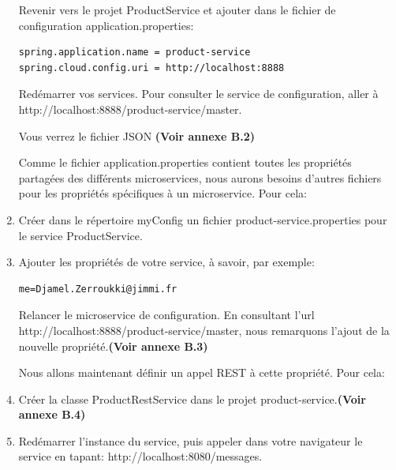 \begin{enumerate}
    	Revenir vers le projet ProductService et ajouter dans le fichier de configuration application.properties:
\begin{lstlisting}
spring.application.name = product-service
spring.cloud.config.uri = http://localhost:8888
\end{lstlisting}
    	
    	Redémarrer vos services. Pour consulter le service de configuration, aller à {\color{red} http://localhost:8888/product-service/master}. 
    	
    	Vous verrez le fichier JSON  \textbf{(Voir annexe B.2)}
    
    	Comme le fichier application.properties contient toutes les propriétés partagées des différents microservices, nous aurons besoins d'autres fichiers pour les propriétés spécifiques à un microservice. Pour cela:
    	
    	\item Créer dans le répertoire myConfig un fichier product-service.properties pour le service ProductService.
    	
    	\item  Ajouter les propriétés de votre service, à savoir, par exemple:
    	
\begin{lstlisting}
me=Djamel.Zerroukki@jimmi.fr
\end{lstlisting} 
    	
    	Relancer le microservice de configuration. En consultant l'url {\color{red}http://localhost:8888/product-service/master}, nous remarquons l'ajout de la nouvelle propriété.\textbf{(Voir annexe B.3)}
    	 
    	Nous allons maintenant définir un appel REST à cette propriété. Pour cela:
    	
    	\item Créer la classe ProductRestService dans le projet product-service.\textbf{(Voir annexe B.4)}
    	
  
    	
    	
    	\item Redémarrer l'instance  du service, puis appeler dans votre navigateur le service en tapant: {\color{red} http://localhost:8080/messages}. 
    	
    	
    	
    \end{enumerate}
    
    
    
    
    
    
